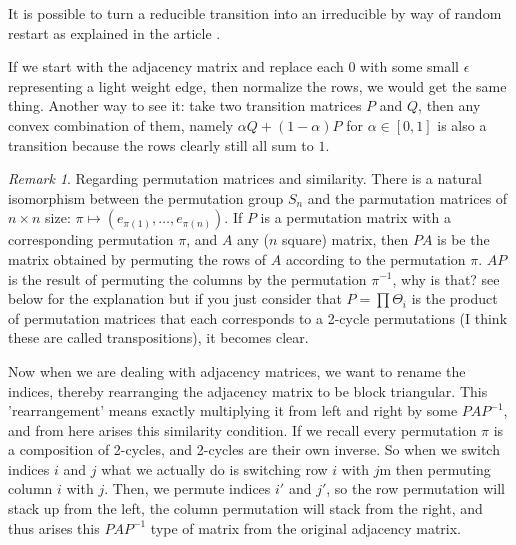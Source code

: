 \documentclass[a4paper,10pt]{article}
\theoremstyle{definition}
\theoremstyle{remark}
\newtheorem{remark}{Remark}
\theoremstyle{plain}
\begin{document}
It is possible to turn a reducible transition into an irreducible by way of
random restart as explained in the article \textcite{cowen2017network}.

If we start with the adjacency matrix and replace each $0$ with some small
$\epsilon$ representing a light weight edge, then normalize the rows, we would
get the same thing. Another way to see it: take two transition matrices $P$ and
$Q$, then any convex combination of them, namely $\alpha Q + (1-\alpha)P$ for
$\alpha \in [0,1]$ is also a transition because the rows clearly still all sum
to $1$.

\begin{remark}
\label{remark:permutations}
Regarding permutation matrices and similarity.
There is a natural isomorphism between the permutation group $S_n$ and the
parmutation matrices of $n\times n$ size: 
$\pi \mapsto (e_{\pi(1)},\dots, e_{\pi(n)})$. If $P$ is a permutation matrix
with a corresponding permutation $\pi$, 
and $A$ any ($n$ square) matrix, then $PA$ is be the matrix obtained by
permuting the rows of $A$ according to the permutation $\pi$. $AP$ is the result
of permuting the columns by the permutation $\pi^{-1}$, why is that? see below
for the explanation but if you just consider that $P = \prod \Theta_i$ is the
product of permutation matrices that each corresponds to a 2-cycle permutations
(I think these are called transpositions), it becomes clear.

Now when we are dealing with adjacency matrices, we want to rename the indices,
thereby rearranging the adjacency matrix to be block triangular. This
'rearrangement' means exactly multiplying it from left and right by some
$PAP^{-1}$, and from here arises this similarity condition. If we recall every
permutation $\pi$ is a composition of 2-cycles, and 2-cycles are their own
inverse. So when we switch indices $i$ and $j$ what we actually do is switching
row $i$ with $j$m then permuting column $i$ with $j$. Then, we permute indices
$i'$ and $j'$, so the row permutation will stack up from the left, the column
permutation will stack from the right, and thus arises this $PAP^{-1}$ type of
matrix from the original adjacency matrix.
\end{remark}
\end{document}
